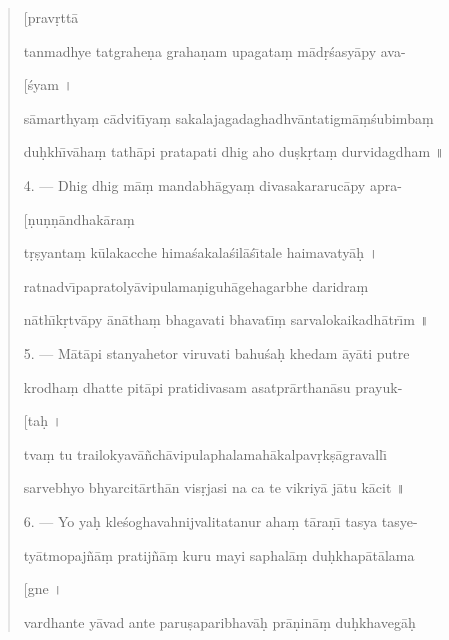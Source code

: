 \documentclass[a4paper, 11pt, oneside, french]{article}
\begin{document}
\begin{quotation}
\hspace*{85mm}[prav\d{r}tt\={a}

tanmadhye tatgrahe\d{n}a graha\d{n}am upagata\d{m} m\={a}d\d{r}\'{s}asy\={a}py ava-

\hspace*{85mm}[\'{s}yam \texthindi{।}

s\={a}marthya\d{m} c\={a}dvit\={\i}ya\d{m} sakalajagadaghadhv\={a}ntatigm\={a}\d{m}\'{s}ubimba\d{m}

du\d{h}kh\={\i}v\={a}ha\d{m} tath\={a}pi pratapati dhig aho du\d{s}k\d{r}ta\d{m} durvidagdham \texthindi{॥}

\bigskip

4. --- Dhig dhig m\={a}\d{m} mandabh\={a}gya\d{m} divasakararuc\={a}py apra-

\hspace*{85mm}[\d{n}u\d{n}\d{n}\={a}ndhak\={a}ra\d{m}

t\d{r}\d{s}yanta\d{m} k\={u}lakacche hima\'{s}akala\'{s}il\={a}\'{s}\={\i}tale haimavaty\={a}\d{h} \texthindi{।}

ratnadv\={\i}papratoly\={a}vipulama\d{n}iguh\={a}gehagarbhe daridra\d{m}

n\={a}th\={\i}k\d{r}tv\={a}py \={a}n\={a}tha\d{m} bhagavati bhavat\={\i}\d{m} sarvalokaikadh\={a}tr\={\i}m \texthindi{॥}

\bigskip

5. --- M\={a}t\={a}pi stanyahetor viruvati bahu\'{s}a\d{h} khedam \={a}y\={a}ti putre

krodha\d{m} dhatte pit\={a}pi pratidivasam asatpr\={a}rthan\={a}su prayuk-

\hspace*{85mm}[ta\d{h} \texthindi{।}

tva\d{m} tu trailokyav\={a}\~{n}ch\={a}vipulaphalamah\={a}kalpav\d{r}k\d{s}\={a}gravall\={\i}

sarvebhyo bhyarcit\={a}rth\={a}n vis\d{r}jasi na ca te vikriy\={a} j\={a}tu k\={a}cit \texthindi{॥}

\bigskip

6. --- Yo ya\d{h} kle\'{s}oghavahnijvalitatanur aha\d{m} t\={a}ra\d{n}\={\i} tasya tasye-

ty\={a}tmopaj\~{n}\={a}\d{m} pratij\~{n}\={a}\d{m} kuru mayi saphal\={a}\d{m} du\d{h}khap\={a}t\={a}lama

\hspace*{85mm}[gne \texthindi{।}

vardhante y\={a}vad ante paru\d{s}aparibhav\={a}\d{h} pr\={a}\d{n}in\={a}\d{m} du\d{h}khaveg\={a}\d{h}


\end{quotation}
\end{document}
